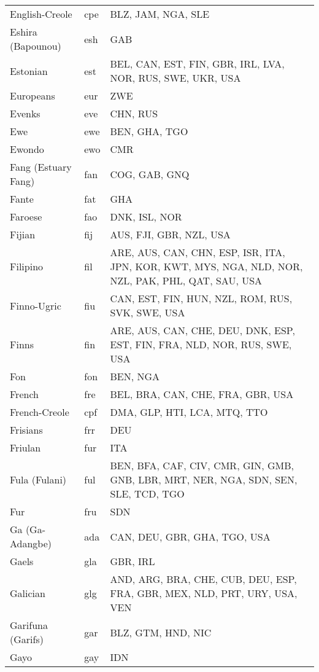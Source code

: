 \documentclass[12pt]{article}
\begin{document}
\begin{center}
\begin{longtable}{|p{7cm}|p{1cm}|p{7cm}|}
English-Creole	&	cpe 	&	BLZ, JAM, NGA, SLE	\\	\cline{1-3}
Eshira (Bapounou)	&	esh	&	GAB	\\	\cline{1-3}
Estonian	&	est 	&	BEL, CAN, EST, FIN, GBR, IRL, LVA, NOR, RUS, SWE, UKR, USA	\\	\cline{1-3}
Europeans	&	eur	&	ZWE	\\	\cline{1-3}
Evenks	&	eve	&	CHN, RUS	\\	\cline{1-3}
Ewe	&	ewe 	&	BEN, GHA, TGO	\\	\cline{1-3}
Ewondo	&	ewo 	&	CMR	\\	\cline{1-3}
Fang (Estuary Fang)	&	fan 	&	COG, GAB, GNQ	\\	\cline{1-3}
Fante	&	fat 	&	GHA	\\	\cline{1-3}
Faroese	&	fao 	&	DNK, ISL, NOR	\\	\cline{1-3}
Fijian	&	fij 	&	AUS, FJI, GBR, NZL, USA	\\	\cline{1-3}
Filipino	&	fil 	&	ARE, AUS, CAN, CHN, ESP, ISR, ITA, JPN, KOR, KWT, MYS, NGA, NLD, NOR, NZL, PAK, PHL, QAT, SAU, USA	\\	\cline{1-3}
Finno-Ugric	&	fiu 	&	CAN, EST, FIN, HUN, NZL, ROM, RUS, SVK, SWE, USA	\\	\cline{1-3}
Finns	&	fin 	&	ARE, AUS, CAN, CHE, DEU, DNK, ESP, EST, FIN, FRA, NLD, NOR, RUS, SWE, USA	\\	\cline{1-3}
Fon	&	fon 	&	BEN, NGA	\\	\cline{1-3}
French	&	fre	&	BEL, BRA, CAN, CHE, FRA, GBR, USA	\\	\cline{1-3}
French-Creole	&	cpf 	&	DMA, GLP, HTI, LCA, MTQ, TTO	\\	\cline{1-3}
Frisians	&	frr 	&	DEU	\\	\cline{1-3}
Friulan	&	fur 	&	ITA	\\	\cline{1-3}
Fula (Fulani)	&	ful 	&	BEN, BFA, CAF, CIV, CMR, GIN, GMB, GNB, LBR, MRT, NER, NGA, SDN, SEN, SLE, TCD, TGO	\\	 \cline{1-3}
Fur	&	fru	&	SDN	\\	\cline{1-3}
Ga (Ga-Adangbe)	&	ada 	&	CAN, DEU, GBR, GHA, TGO, USA	\\	\cline{1-3}
Gaels	&	gla 	&	GBR, IRL	\\	\cline{1-3}
Galician	&	glg 	&	AND, ARG, BRA, CHE, CUB, DEU, ESP, FRA, GBR, MEX, NLD, PRT, URY, USA, VEN	\\	\cline{1-3}
Garifuna (Garifs)	&	gar	&	BLZ, GTM, HND, NIC	\\	\cline{1-3}
Gayo	&	gay 	&	IDN	\\	\cline{1-3}

\end{longtable}
\end{center}
\end{document}
